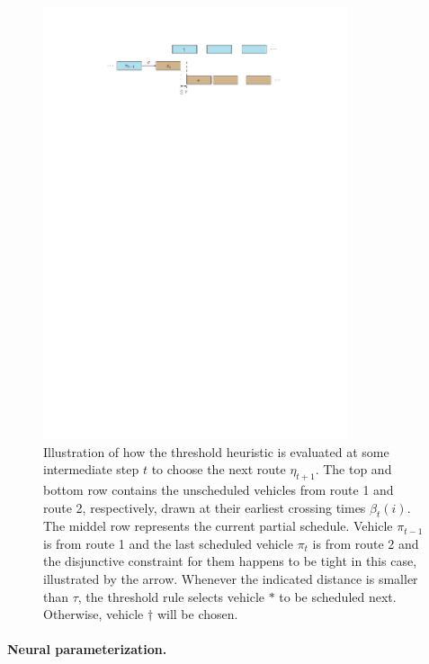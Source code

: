 \documentclass[a4paper]{report}
\theoremstyle{definition}
\theoremstyle{plain}
\begin{document}
\begin{figure}
  \centering
  \includegraphics[width=0.8\textwidth]{figures/single/threshold}
  \caption{Illustration of how the threshold heuristic is evaluated at some
    intermediate step $t$ to choose the next route $\eta_{t+1}$. The top and
    bottom row contains the unscheduled vehicles from route 1 and route 2,
    respectively, drawn at their earliest crossing times $\beta_{t}(i)$. The
    middel row represents the current partial schedule. Vehicle $\pi_{t-1}$ is
    from route 1 and the last scheduled vehicle $\pi_{t}$ is from route 2 and
    the disjunctive constraint for them happens to be tight in this case,
    illustrated by the arrow. Whenever the indicated distance is smaller than
    $\tau$, the threshold rule selects vehicle $*$ to be scheduled next. Otherwise,
    vehicle $\dagger$ will be chosen.}\label{fig:threshold_heuristic}
\end{figure}


\paragraph{Neural parameterization.}
\end{document}
